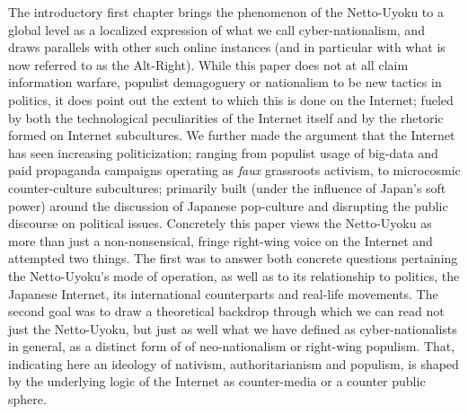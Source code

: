 \documentclass[10pt,british,A4paper,oneside]{memoir}
\begin{document}
The introductory first chapter brings the phenomenon of the Netto-Uyoku
to a global level as a localized expression of what we call
cyber-nationalism, and draws parallels with other such online instances
(and in particular with what is now referred to as the Alt-Right). While
this paper does not at all claim information warfare, populist
demagoguery or nationalism to be new tactics in politics, it does point
out the extent to which this is done on the Internet; fueled by both the
technological peculiarities of the Internet itself and by the rhetoric
formed on Internet subcultures. We further made the argument that the
Internet has seen increasing politicization; ranging from populist usage
of big-data and paid propaganda campaigns operating as \emph{faux}
grassroots activism, to microcosmic counter-culture subcultures;
primarily built (under the influence of Japan's soft power) around the
discussion of Japanese pop-culture and disrupting the public discourse
on political issues. Concretely this paper views the Netto-Uyoku as more
than just a non-nonsensical, fringe right-wing voice on the Internet and
attempted two things. The first was to answer both concrete questions
pertaining the Netto-Uyoku's mode of operation, as well as to its
relationship to politics, the Japanese Internet, its international
counterparts and real-life movements. The second goal was to draw a
theoretical backdrop through which we can read not just the Netto-Uyoku,
but just as well what we have defined as cyber-nationalists in general,
as a distinct form of of neo-nationalism or right-wing populism. That,
indicating here an ideology of nativism, authoritarianism and populism, is
shaped by the underlying logic of the Internet as counter-media or a
counter public sphere.
\end{document}
